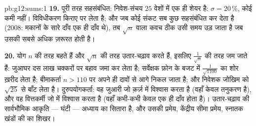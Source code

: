 \begin{solution}{pb:g12:sums:1}
\textbf{19.} पूरी तरह सहसंबंधित: निवेश-संचय $25$ वेशों में एक ही शेयर है:
$\sigma = 20\,\%$, कोई कमी नहीं। विविधीकरण \emph{} किराए पर लेता है; और जब कोई
संकट सब कुछ सहसंबंधित कर देता है (2008: मकानों के सारे दाँव एक ही दाँव थे),
तब $\sqrt n$ वाला कवच ठीक उसी समय उड़ जाता है जब उसकी सबसे अधिक ज़रूरत होती है।

\textbf{20.} योग $n$ की तरह बहते हैं और $\sqrt n$ की तरह उतार-चढ़ाव करते हैं,
इसलिए  $\frac{1}{\sqrt n}$ की तरह जम जाते हैं: जुआघर दस लाख चक्करों पर बहाव जमा कर
लेता है; सर्वेक्षक फ़ोन के बजट में $\frac{1}{\sqrt{1100}}$ का शोर ख़रीद लेता है; बीमाकर्ता $n > 110$
पर अपने ही दावों से आगे निकल जाता है; और निवेशक जोखिम को $\sqrt{25}$ से बाँट लेता
है। दुरुपयोगकर्ता: वह जुआरी जो क़र्ज़ में विश्वास करता है (वहाँ केवल तनुकरण
है), और वह वित्तकर्मी जो  में विश्वास करता है (वहाँ कभी-कभी केवल एक
ही दाँव होता है)। उतार-चढ़ाव की सार्वभौमिक आकृति --- घंटी ---  अध्याय का
सितारा है, और उसकी प्रमेय, केंद्रीय सीमा प्रमेय, स्नातक खंडों की  का
शिखर।
\end{solution}

